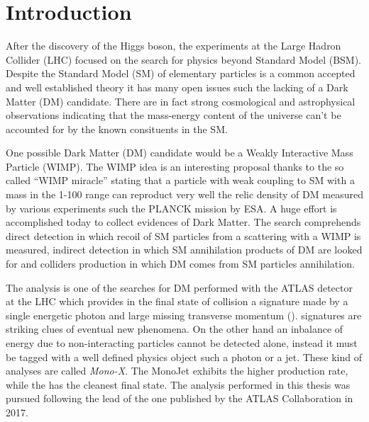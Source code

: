 \chapter{Introduction}
\lettrine{A}{}fter the discovery of the Higgs boson, the experiments at the Large Hadron Collider (LHC) focused on the search for physics beyond Standard Model (BSM). Despite the Standard Model (SM) of elementary particles is a common accepted and well established theory it has many open issues such the lacking of a Dark Matter (DM) candidate. There are in fact strong cosmological and astrophysical observations indicating that the mass-energy content of the universe can't be accounted for by the known consituents in the SM.
  
One possible Dark Matter (DM) candidate would be a Weakly Interactive Mass Particle (WIMP). The WIMP idea is an interesting proposal thanks to the so called ``WIMP miracle'' stating that a particle with weak coupling to SM with a mass in the \SI{1}{\gev}-\SI{100}{\gev} range can reproduct very well the relic density of DM measured by various experiments such the PLANCK mission by ESA. A huge effort is accomplished today to collect evidences of Dark Matter. The search comprehends direct detection in which recoil of SM particles from a scattering with a WIMP is measured, indirect detection in which SM annihilation products of DM are looked for and colliders production in which DM comes from SM particles annihilation.

The \mph analysis is one of the searches for DM performed with the ATLAS detector at the LHC which provides in the final state of \pp collision a signature made by a single energetic photon and large missing transverse momentum (\met). \met signatures are striking clues of eventual new phenomena. On the other hand an inbalance of energy due to non-interacting particles cannot be detected alone, instead it must be tagged with a well defined physics object such a photon or a jet. These kind of analyses are called \emph{Mono-X}. The MonoJet exhibits the higher production rate, while the \mph has the cleanest final state. The analysis performed in this thesis was pursued following the lead of the one published by the ATLAS Collaboration in 2017.

